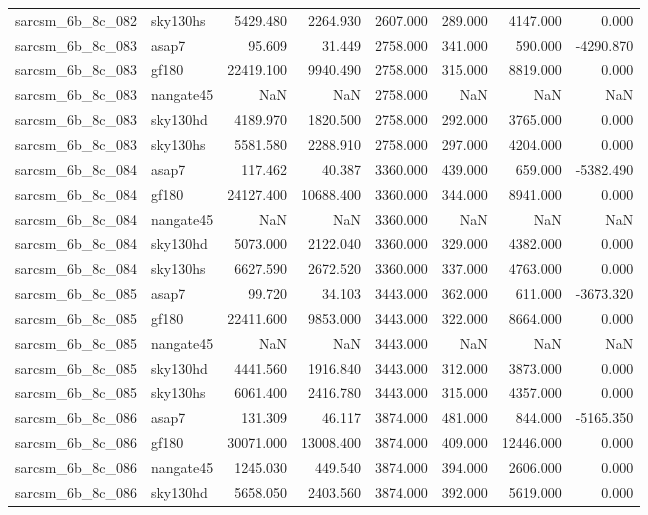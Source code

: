 \begin{tabular}{llrrrrrr}
sarcsm\_6b\_8c\_082 & sky130hs & 5429.480 & 2264.930 & 2607.000 & 289.000 & 4147.000 & 0.000 \\
sarcsm\_6b\_8c\_083 & asap7 & 95.609 & 31.449 & 2758.000 & 341.000 & 590.000 & -4290.870 \\
sarcsm\_6b\_8c\_083 & gf180 & 22419.100 & 9940.490 & 2758.000 & 315.000 & 8819.000 & 0.000 \\
sarcsm\_6b\_8c\_083 & nangate45 & NaN & NaN & 2758.000 & NaN & NaN & NaN \\
sarcsm\_6b\_8c\_083 & sky130hd & 4189.970 & 1820.500 & 2758.000 & 292.000 & 3765.000 & 0.000 \\
sarcsm\_6b\_8c\_083 & sky130hs & 5581.580 & 2288.910 & 2758.000 & 297.000 & 4204.000 & 0.000 \\
sarcsm\_6b\_8c\_084 & asap7 & 117.462 & 40.387 & 3360.000 & 439.000 & 659.000 & -5382.490 \\
sarcsm\_6b\_8c\_084 & gf180 & 24127.400 & 10688.400 & 3360.000 & 344.000 & 8941.000 & 0.000 \\
sarcsm\_6b\_8c\_084 & nangate45 & NaN & NaN & 3360.000 & NaN & NaN & NaN \\
sarcsm\_6b\_8c\_084 & sky130hd & 5073.000 & 2122.040 & 3360.000 & 329.000 & 4382.000 & 0.000 \\
sarcsm\_6b\_8c\_084 & sky130hs & 6627.590 & 2672.520 & 3360.000 & 337.000 & 4763.000 & 0.000 \\
sarcsm\_6b\_8c\_085 & asap7 & 99.720 & 34.103 & 3443.000 & 362.000 & 611.000 & -3673.320 \\
sarcsm\_6b\_8c\_085 & gf180 & 22411.600 & 9853.000 & 3443.000 & 322.000 & 8664.000 & 0.000 \\
sarcsm\_6b\_8c\_085 & nangate45 & NaN & NaN & 3443.000 & NaN & NaN & NaN \\
sarcsm\_6b\_8c\_085 & sky130hd & 4441.560 & 1916.840 & 3443.000 & 312.000 & 3873.000 & 0.000 \\
sarcsm\_6b\_8c\_085 & sky130hs & 6061.400 & 2416.780 & 3443.000 & 315.000 & 4357.000 & 0.000 \\
sarcsm\_6b\_8c\_086 & asap7 & 131.309 & 46.117 & 3874.000 & 481.000 & 844.000 & -5165.350 \\
sarcsm\_6b\_8c\_086 & gf180 & 30071.000 & 13008.400 & 3874.000 & 409.000 & 12446.000 & 0.000 \\
sarcsm\_6b\_8c\_086 & nangate45 & 1245.030 & 449.540 & 3874.000 & 394.000 & 2606.000 & 0.000 \\
sarcsm\_6b\_8c\_086 & sky130hd & 5658.050 & 2403.560 & 3874.000 & 392.000 & 5619.000 & 0.000 \\

\end{tabular}
